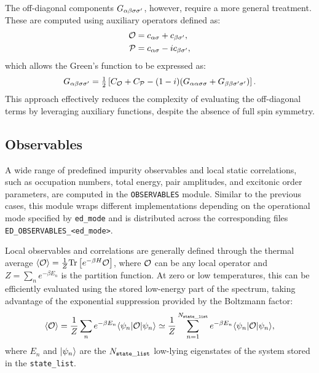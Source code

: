 \documentclass[edipack_sp.tex]{subfiles}
\begin{document}
The off-diagonal components $G_{\alpha\beta\sigma\sigma'}$, however, 
require a more general treatment. These are computed using 
auxiliary operators defined as:
\begin{align*}
{\cal O} &= c_{\alpha\sigma} + c_{\beta\sigma'}, \\
{\cal P} &= c_{\alpha\sigma} - i c_{\beta\sigma'},
\end{align*}
which allows the Green's function to be expressed as:
\begin{equation}
G_{\alpha\beta\sigma\sigma'} = \tfrac{1}{2} \left[ C_{\cal O} + C_{\cal P} - 
(1-i)(G_{\alpha\alpha\sigma\sigma} + G_{\beta\beta\sigma'\sigma'}) \right].
\end{equation}
This approach effectively reduces the complexity of 
evaluating the off-diagonal terms by leveraging auxiliary 
functions, despite the absence of full spin symmetry.





\subsection{Observables}\label{sSecObc}
A wide range of predefined impurity observables and local 
static correlations, such as occupation numbers, total 
energy, pair amplitudes, and excitonic order parameters, 
are computed in the \texttt{OBSERVABLES} module. Similar to the
previous cases, this module wraps different implementations 
depending on the operational mode specified by 
{\tt ed\_mode} and is distributed across the corresponding 
files {\tt ED\_OBSERVABLES\_<ed\_mode>}. 



Local observables and correlations are generally defined 
through the thermal average 
$\langle {\cal O}\rangle = \tfrac{1}{Z}{\rm Tr}\left[e^{-\beta H}{\cal O}\right]$, 
where ${\cal O}$ can be any local operator and  $Z = \sum_n e^{-\beta E_n}$ is the partition function. 
At zero or low temperatures, this can be efficiently 
evaluated using the stored low-energy part of the spectrum, 
taking advantage of the exponential suppression provided by 
the Boltzmann factor:
\begin{equation}
\langle {\cal O}\rangle = \frac{1}{Z}\sum_n e^{-\beta E_n}
\langle \psi_n| {\cal O} |\psi_n\rangle\simeq \frac{1}{Z}\sum_{n=1}^{N_{\tt state\_list}} e^{-\beta E_n}
\langle \psi_n| {\cal O} |\psi_n\rangle,
\label{eq:thermal_average}
\end{equation}
where $E_n$ and $|\psi_n\rangle$ are the $N_{\tt state\_list}$ low-lying eigenstates 
of the system stored in the {\tt state\_list}. 
\end{document}
